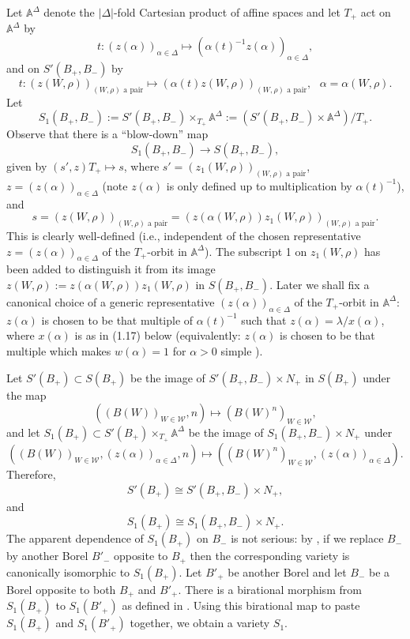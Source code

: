 \documentclass[12pt,letterpaper]{amsart}
\newcommand{\aaa}{\mathbb{A}}
\begin{document}
Let $\aaa^\Delta$ denote the $|\Delta|$-fold Cartesian product
of affine spaces and let $T_+$ act on $\aaa^\Delta$ by
\[
t:(z(\alpha))_{\alpha\in\Delta}\longmapsto
(\alpha(t)^{-1}z(\alpha))_{\alpha\in\Delta},
\]
and on $S'(B_+,B_-)$ by
\[
t:(z(W,\rho))_{(W,\rho)\text{ a pair}}\longmapsto
(\alpha(t)z(W,\rho))_{(W,\rho)\text{ a pair}},\ \ \ \alpha=\alpha(W,\rho).
\]
Let
\[
S_1(B_+,B_-):=S'(B_+,B_-)\times_{T_+}\aaa^\Delta:=
(S'(B_+,B_-)\times\aaa^\Delta)/T_+.
\tag{1.13}
\]
Observe that there is a ``blow-down'' map
\[
S_1(B_+,B_-)\rightarrow S(B_+,B_-),
\tag{1.14}
\]
given by $(s',z)T_+\longmapsto s$, where
$s'=(z_1(W,\rho))_{(W,\rho)\text{ a pair}}$,
$z=(z(\alpha))_{\alpha\in\Delta}$ (note $z(\alpha)$ is only defined up to
multiplication by $\alpha(t)^{-1}$), and
\[
s=(z(W,\rho))_{(W,\rho)\text{ a pair}}
=(z(\alpha(W,\rho))z_1(W,\rho))_{(W,\rho)\text{ a pair}}.
\]
This is clearly well-defined (i.e., independent of the chosen
representative
$z=(z(\alpha))_{\alpha\in\Delta}$ of the $T_+$-orbit in $\aaa^\Delta$).
The subscript 1 on $z_1(W,\rho)$ has been added to distinguish it
from its image
$z(W,\rho):=z(\alpha(W,\rho))z_1(W,\rho)$ in $S(B_+,B_-)$.
Later we shall fix a canonical choice of a generic representative
$(z(\alpha))_{\alpha\in\Delta}$ of the $T_+$-orbit in $\aaa^\Delta$:
$z(\alpha)$ is chosen to be that multiple of $\alpha(t)^{-1}$
such that $z(\alpha)=\lambda /x(\alpha)$, where $x(\alpha)$ is as in
(1.17) below (equivalently: $z(\alpha)$ is chosen to be that multiple
which makes $w(\alpha)=1$ for $\alpha >0$ simple \cite[ch II, \S 2]{Ha92a}).

Let $S'(B_+)\subset S(B_+)$ be the image of
$S'(B_+,B_-)\times N_+$ in $S(B_+)$ under the map
\[
((B(W))_{W\in{\mathcal W}},n)\longmapsto (B(W)^n)_{W\in{\mathcal W}},
\]
and let $S_1(B_+)\subset S'(B_+)\times_{T_+}\aaa^\Delta$
be the image of $S_1(B_+,B_-)\times N_+$ under
\[
((B(W))_{W\in{\mathcal W}},(z(\alpha))_{\alpha\in\Delta},n)
\longmapsto ((B(W)^n)_{W\in{\mathcal W}},(z(\alpha))_{\alpha\in\Delta}).
\]
Therefore,
\[
S'(B_+)\cong S'(B_+,B_-)\times N_+,
\tag{1.15a}
\]
and
\[
S_1(B_+)\cong S_1(B_+,B_-)\times N_+.
\tag{1.15b}
\]
The apparent dependence of $S_1(B_+)$ on $B_-$ is not serious:
by \cite[Lemma 3.6]{La83}, if we replace $B_-$ by another
Borel $B'_-$ opposite
to $B_+$ then the corresponding variety is canonically isomorphic
to $S_1(B_+)$.
Let $B'_+$ be another Borel and let $B_-$ be a Borel opposite to both
$B_+$ and $B'_+$. There is a birational morphism from
$S_1(B_+)$ to $S_1(B'_+)$ as defined in \cite{La83}. Using this birational map
to paste $S_1(B_+)$ and $S_1(B'_+)$ together, we obtain
a variety $S_1$.
\end{document}

